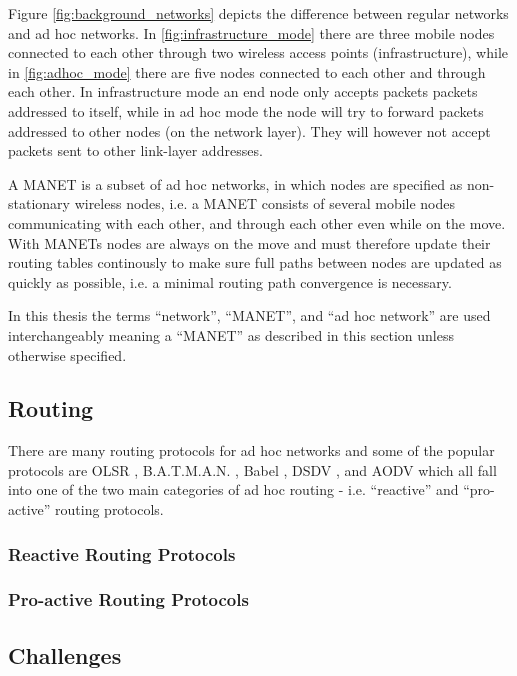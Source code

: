 Figure \ref{fig:background_networks} depicts the difference between regular
networks and ad hoc networks. In \ref{fig:infrastructure_mode} there are three
mobile nodes connected to each other through two wireless access points
(infrastructure), while in \ref{fig:adhoc_mode} there are five nodes connected
to each other and through each other. In infrastructure mode an end node only
accepts packets packets addressed to itself, while in ad hoc mode the node will
try to forward packets addressed to other nodes (on the network layer). They
will however not accept packets sent to other link-layer addresses.

A \ac{MANET} is a subset of ad hoc networks, in which nodes are specified as
non-stationary wireless nodes, i.e. a \ac{MANET} consists of several mobile
nodes communicating with each other, and through each other even while on the
move. With \acp{MANET} nodes are always on the move and must therefore update
their routing tables continously to make sure full paths between nodes are
updated as quickly as possible, i.e. a minimal routing path convergence is
necessary.

In this thesis the terms ``network'', ``\ac{MANET}'', and ``ad hoc network''
are used interchangeably meaning a ``\ac{MANET}'' as described in this section
unless otherwise specified.

\subsection{Routing}
There are many routing protocols for ad hoc networks and some of the popular
protocols are OLSR \cite{olsr_paper}, B.A.T.M.A.N. \cite{batman_rfc}, Babel
\cite{rfc6126}, DSDV \cite{he2002destination}, and AODV
\cite{Perkins:2003:AHO:RFC3561} which all fall into one of the two main
categories of ad hoc routing - i.e. ``reactive'' and ``pro-active'' routing
protocols.

\subsubsection*{Reactive Routing Protocols}


\subsubsection*{Pro-active Routing Protocols}


\subsection{Challenges}


